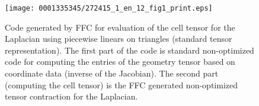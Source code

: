\begin{figure}[!t]
\bwfig
\texttt{[image: 0001335345/272415\_1\_en\_12\_fig1\_print.eps]}
  \caption{Code generated by FFC for evaluation of the cell tensor
    for the Laplacian using piecewise linears on triangles (standard
    tensor representation). The first part of the code is standard
    non-optimized code for computing the entries of the geometry
    tensor based on coordinate data (inverse of the Jacobian). The
    second part (computing the cell tensor) is the FFC generated
    non-optimized tensor contraction for the Laplacian.}
  \label{fig:code,poisson}\vspace*{6pt}
\end{figure}


